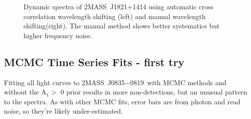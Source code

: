 \documentclass[twocolumn]{aastex6}
\newcommand{\sha}{2MASS~J0835$-$0819}
\newcommand{\shb}{2MASS~J1821+1414}
\begin{document}
\begin{figure}[!t]
\centering
{}
	\caption{Dynamic spectra of {\shb} using automatic cross correlation wavelength shifting (left) and manual wavelength shifting(right).
	The manual method shows better systematics but higher frequency noise.}
	\label{fig:manualVsAutoShift1821}
	\vspace{0.1in}
\end{figure} 

\clearpage
\pagebreak
\subsection{MCMC Time Series Fits - first try}

Fitting all light curves to \sha\ with MCMC methods and without the A$_1 >$ 0 prior results in more non-detections, but an unusual pattern to the spectra.
As with other MCMC fits, error bars are from photon and read noise, so they're likely under-estimated.
\end{document}
